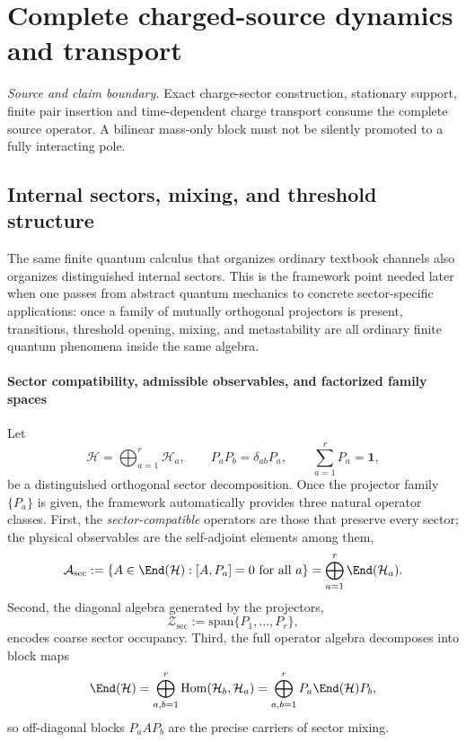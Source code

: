 \documentclass[12pt,a4paper]{article}
\begin{document}
\section{Complete charged-source dynamics and transport}
\label{p4b:sec:v238-b5}
\noindent\textit{Source and claim boundary.} Exact charge-sector construction, stationary support, finite pair insertion and time-dependent charge transport consume the complete source operator. A bilinear mass-only block must not be silently promoted to a fully interacting pole.

\subsection{Internal sectors, mixing, and threshold structure}
\label{p4:sec:part2-internal-thresholds}

The same finite quantum calculus that organizes ordinary textbook channels also organizes
distinguished internal sectors.
This is the framework point needed later when one passes from abstract quantum mechanics to concrete sector-specific applications:
once a family of mutually orthogonal projectors is present, transitions, threshold opening,
mixing, and metastability are all ordinary finite quantum phenomena inside the same algebra.




\paragraph{Sector compatibility, admissible observables, and factorized family spaces}
\label{p4:sec:part2-sector-compatibility}

Let
\[
\mathcal H=\bigoplus_{a=1}^r \mathcal H_a,
\qquad
P_aP_b=\delta_{ab}P_a,
\qquad
\sum_{a=1}^r P_a=\mathbf 1,
\]
be a distinguished orthogonal sector decomposition.
Once the projector family $\{P_a\}$ is given, the framework automatically provides three natural operator classes.
First, the \emph{sector-compatible} operators are those that preserve every sector; the physical observables are the self-adjoint elements among them,
\begin{equation}
\label{p4:eq:sector-compatible-observables}
\mathcal A_{\mathrm{sec}}
:=
\{A\in\End(\mathcal H): [A,P_a]=0\ \text{for all $a$}\}
=
\bigoplus_{a=1}^r \End(\mathcal H_a).
\end{equation}
Second, the diagonal algebra generated by the projectors,
\begin{equation}
\label{p4:eq:sector-center}
\mathcal Z_{\mathrm{sec}}:=\mathrm{span}\{P_1,\dots,P_r\},
\end{equation}
encodes coarse sector occupancy.
Third, the full operator algebra decomposes into block maps
\begin{equation}
\label{p4:eq:block-operator-decomp}
\End(\mathcal H)
=
\bigoplus_{a,b=1}^r \mathrm{Hom}(\mathcal H_b,\mathcal H_a)
=
\bigoplus_{a,b=1}^r P_a\End(\mathcal H)P_b,
\end{equation}
so off-diagonal blocks $P_aAP_b$ are the precise carriers of sector mixing.
\end{document}
